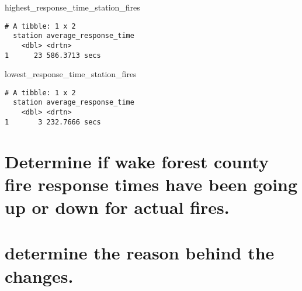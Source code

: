 \documentclass[
  letterpaper,
  DIV=11,
  numbers=noendperiod]{scrartcl}
\newenvironment{Shaded}{\begin{snugshade}}{\end{snugshade}}
\newcommand{\NormalTok}[1]{\textcolor[rgb]{0.00,0.23,0.31}{#1}}
\begin{document}
\begin{Shaded}
\begin{Highlighting}[]
\NormalTok{highest\_response\_time\_station\_fires}
\end{Highlighting}
\end{Shaded}

\begin{verbatim}
# A tibble: 1 x 2
  station average_response_time
    <dbl> <drtn>               
1      23 586.3713 secs        
\end{verbatim}

\begin{Shaded}
\begin{Highlighting}[]
\NormalTok{lowest\_response\_time\_station\_fires}
\end{Highlighting}
\end{Shaded}

\begin{verbatim}
# A tibble: 1 x 2
  station average_response_time
    <dbl> <drtn>               
1       3 232.7666 secs        
\end{verbatim}

\section{Determine if wake forest county fire response times have been
going up or down for actual
fires.}\label{determine-if-wake-forest-county-fire-response-times-have-been-going-up-or-down-for-actual-fires.}

\section{determine the reason behind the
changes.}\label{determine-the-reason-behind-the-changes.}
\end{document}
